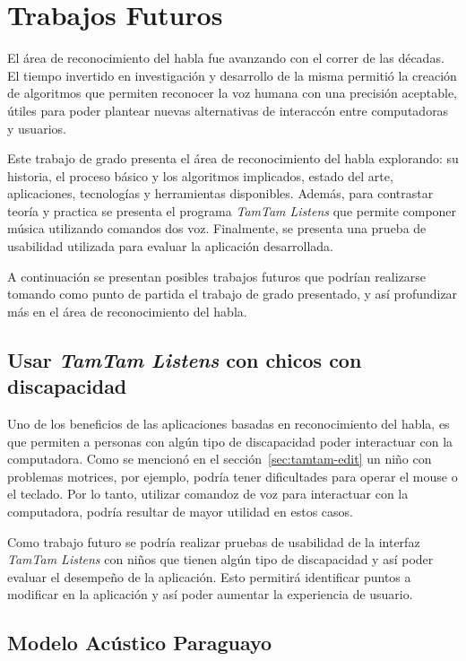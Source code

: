 \chapter{Trabajos Futuros}
\label{sec:trabajos-futuros}

El \'area de reconocimiento del habla fue avanzando con el correr de las d\'ecadas. El tiempo invertido
en investigaci\'on y desarrollo de la misma permiti\'o la creaci\'on de algoritmos que permiten
reconocer la voz humana con una precisi\'on aceptable, \'utiles para poder plantear nuevas alternativas
de interacc\'on entre computadoras y usuarios. 

Este trabajo de grado presenta el \'area de reconocimiento del habla explorando: su historia, el proceso
b\'asico y los algoritmos implicados, estado del arte, aplicaciones, tecnolog\'ias y herramientas disponibles.
Adem\'as, para contrastar teor\'ia y practica se presenta el programa \emph{TamTam Listens} que permite componer
m\'usica utilizando comandos dos voz. Finalmente, se presenta una prueba de usabilidad utilizada para evaluar la
aplicaci\'on desarrollada.

A continuaci\'on se presentan posibles trabajos futuros que podr\'ian realizarse tomando como punto de partida
el trabajo de grado presentado, y as\'i profundizar m\'as en el \'area de reconocimiento del habla.

\section{Usar \emph{TamTam Listens} con chicos con discapacidad}

Uno de los beneficios de las aplicaciones basadas en reconocimiento del habla, es que permiten a personas con alg\'un
tipo de discapacidad poder interactuar con la computadora. Como se mencion\'o en el secci\'on~\ref{sec:tamtam-edit}
un ni\~no con problemas motrices, por ejemplo, podr\'ia tener dificultades para operar el mouse o el teclado. Por lo tanto,
utilizar comandoz de voz para interactuar con la computadora, podr\'ia resultar de mayor utilidad en estos casos.

Como trabajo futuro se podr\'ia realizar pruebas de usabilidad de la interfaz \emph{TamTam Listens} con ni\~nos
que tienen alg\'un tipo de discapacidad y as\'i poder evaluar el desempe\~no de la aplicaci\'on. Esto permitir\'a
identificar puntos a modificar en la aplicaci\'on y as\'i poder aumentar la experiencia de usuario.
\section{Modelo Ac\'ustico Paraguayo} 


